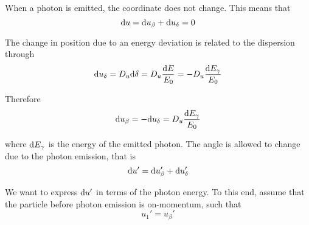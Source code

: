 When a photon is emitted, the coordinate does not change. This means that
\begin{equation}
    \text{d} u = \text{d} u_\beta + \text{d} u_\delta = 0
\end{equation}

The change in position due to an energy deviation is related to the dispersion through
\begin{equation}
    \text{d} u_\delta = D_u \text{d} \delta = D_u \frac{\text{d} E}{E_0} = - D_u \frac{\text{d} E_\gamma}{E_0}
\end{equation}

Therefore
\begin{equation}
    \text{d} u_\beta = - \text{d} u_\delta = D_u \frac{\text{d} E_\gamma}{E_0}
    \label{eq:deeubeta}
\end{equation}

where $\text{d} E_\gamma$ is the energy of the emitted photon. The angle is allowed to change due to the photon emission, that is
\begin{equation}
    \text{d} u' = \text{d} u_\beta' + \text{d} u_\delta'
\end{equation}

We want to express $\text{d} u'$ in terms of the photon energy. To this end, assume that the particle before photon emission is on-momentum, such that
\begin{equation}
    u_1' = u_\beta'
\end{equation}




